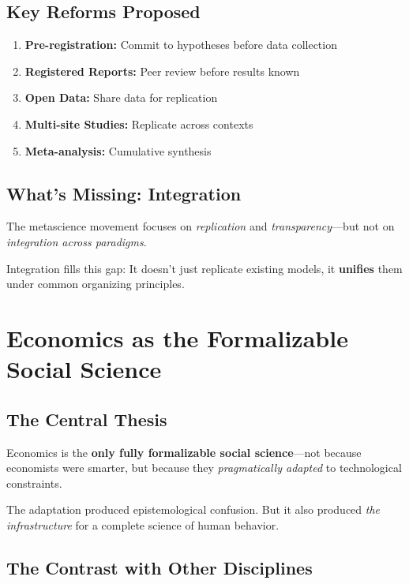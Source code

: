 \documentclass[12pt,a4paper]{article}
\begin{document}
\subsection{Key Reforms Proposed}

\begin{enumerate}
\item \textbf{Pre-registration:} Commit to hypotheses before data collection
\item \textbf{Registered Reports:} Peer review before results known
\item \textbf{Open Data:} Share data for replication
\item \textbf{Multi-site Studies:} Replicate across contexts
\item \textbf{Meta-analysis:} Cumulative synthesis
\end{enumerate}

\subsection{What's Missing: Integration}

The metascience movement focuses on \textit{replication} and \textit{transparency}---but not on \textit{integration across paradigms}.

Integration fills this gap: It doesn't just replicate existing models, it \textbf{unifies} them under common organizing principles.

\section{Economics as the Formalizable Social Science}
\label{sec:thesis}

\subsection{The Central Thesis}

Economics is the \textbf{only fully formalizable social science}---not because economists were smarter, but because they \textit{pragmatically adapted} to technological constraints.

The adaptation produced epistemological confusion. But it also produced \textit{the infrastructure} for a complete science of human behavior.

\subsection{The Contrast with Other Disciplines}
\end{document}
